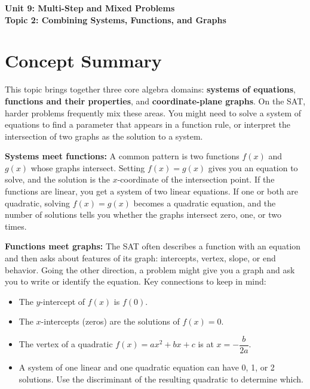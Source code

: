 \documentclass[14pt]{extarticle}
\begin{document}
\raggedright
{}

\begin{center}
    \LARGE \textbf{Unit 9: Multi-Step and Mixed Problems} \\[6pt]
    \Large \textbf{Topic 2: Combining Systems, Functions, and Graphs}
\end{center}

\vspace{1em}

\section*{Concept Summary}

This topic brings together three core algebra domains: \textbf{systems of equations}, \textbf{functions and their properties}, and \textbf{coordinate-plane graphs}. On the SAT, harder problems frequently mix these areas. You might need to solve a system of equations to find a parameter that appears in a function rule, or interpret the intersection of two graphs as the solution to a system.

\textbf{Systems meet functions:} A common pattern is two functions \(f(x)\) and \(g(x)\) whose graphs intersect. Setting \(f(x) = g(x)\) gives you an equation to solve, and the solution is the \(x\)-coordinate of the intersection point. If the functions are linear, you get a system of two linear equations. If one or both are quadratic, solving \(f(x) = g(x)\) becomes a quadratic equation, and the number of solutions tells you whether the graphs intersect zero, one, or two times.

\textbf{Functions meet graphs:} The SAT often describes a function with an equation and then asks about features of its graph: intercepts, vertex, slope, or end behavior. Going the other direction, a problem might give you a graph and ask you to write or identify the equation. Key connections to keep in mind:

\begin{itemize}
  \item The \(y\)-intercept of \(f(x)\) is \(f(0)\).
  \item The \(x\)-intercepts (zeros) are the solutions of \(f(x) = 0\).
  \item The vertex of a quadratic \(f(x) = ax^2 + bx + c\) is at \(x = -\dfrac{b}{2a}\).
  \item A system of one linear and one quadratic equation can have 0, 1, or 2 solutions. Use the discriminant of the resulting quadratic to determine which.
\end{itemize}
\end{document}
